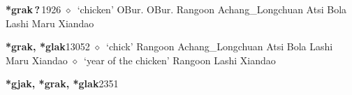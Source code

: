   \begin{list}{}{\leftmargin=1.5em \itemindent=-1.5em}
  \item {\footnotesize \textbf{*grak\,?\,}}{\tiny 1926}
         $\diamond$~`chicken'
         OBur. 
\hspace{1ex}
         OBur. 
\hspace{1ex}
         Rangoon 
\hspace{1ex}
         Achang\_Longchuan 
\hspace{1ex}
         Atsi 
\hspace{1ex}
         Bola 
\hspace{1ex}
         Lashi 
\hspace{1ex}
         Maru 
\hspace{1ex}
         Xiandao 
  \item {\footnotesize \textbf{*grak, *glak}}{\tiny 13052}
\hspace{1ex}
         $\diamond$~`chick'
         Rangoon 
\hspace{1ex}
         Achang\_Longchuan 
\hspace{1ex}
         Atsi 
\hspace{1ex}
         Bola 
\hspace{1ex}
         Lashi 
\hspace{1ex}
         Maru 
\hspace{1ex}
         Xiandao 
\hspace{1ex}
         $\diamond$~`year of the chicken'
         Rangoon 
\hspace{1ex}
         Lashi 
\hspace{1ex}
         Xiandao 
  \item {\footnotesize \textbf{*gjak, *grak, *glak}}{\tiny 2351}

\end{list}
